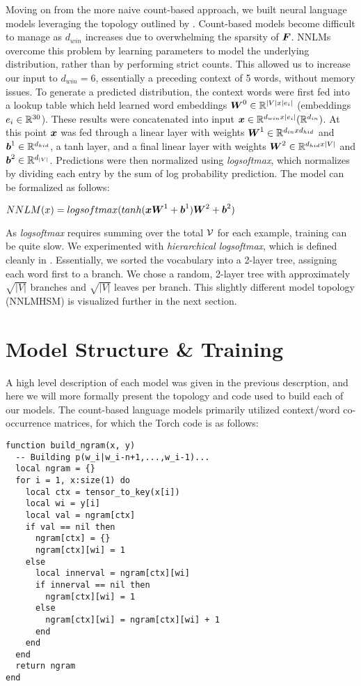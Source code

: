 \documentclass[11pt]{article}
\begin{document}
Moving on from the more naive count-based approach, we built neural language models leveraging the topology outlined by \citet{DBLP:journals/jmlr/BengioDVJ03}. Count-based models become difficult to manage as $d_{win}$ increases due to overwhelming the sparsity of $\boldsymbol{F}$. NNLMs overcome this problem by learning parameters to model the underlying distribution, rather than by performing strict counts. This allowed us to increase our input to $d_{win} = 6$, essentially a preceding context of 5 words, without memory issues. To generate a predicted distribution, the context words were first fed into a lookup table which held learned word embeddings $\boldsymbol{W}^{0} \in \mathbb{R}^{|V| x |e_{i}|}$ (embeddings $e_{i} \in \mathbb{R}^{30}$). These results were concatenated into input $\boldsymbol{x} \in \mathbb{R}^{d_{win} x |e_{i}|} (\mathbb{R}^{d_{in}})$. At this point $\boldsymbol{x}$ was fed through a linear layer with weights $\boldsymbol{W}^{1} \in \mathbb{R}^{d_{in} x d_{hid}}$ and $\boldsymbol{b}^{1} \in \mathbb{R}^{d_{hid}}$, a tanh layer, and a final linear layer with weights $\boldsymbol{W}^{2} \in \mathbb{R}^{d_{hid} x |V|}$ and $\boldsymbol{b}^{2} \in \mathbb{R}^{d_{|V|}}$. Predictions were then normalized using \textit{logsoftmax}, which normalizes by dividing each entry by the sum  of log probability prediction. The model can be formalized as follows:
\begin{center}
    $NNLM(x) = logsoftmax(tanh(\boldsymbol{x}\boldsymbol{W}^{1} + \boldsymbol{b}^{1})\boldsymbol{W}^{2} + \boldsymbol{b}^{2})$
\end{center}

As \textit{logsoftmax} requires summing over the total $\mathcal{V}$ for each example, training can be quite slow. We experimented with \textit{hierarchical logsoftmax}, which is defined cleanly in \citet{DBLP:journals/corr/MikolovSCCD13}. Essentially, we sorted the vocabulary into a 2-layer tree, assigning each word first to a branch. We chose a random, 2-layer tree with approximately $\sqrt{|V|}$ branches and $\sqrt{|V|}$ leaves per branch. This slightly different model topology (NNLMHSM) is visualized further in the next section.

\section{Model Structure \& Training}

A high level description of each model was given in the previous descrption, and here we will more formally present the topology and code used to build each of our models. The count-based language models primarily utilized context/word co-occurrence matrices, for which the Torch code is as follows:
\begin{verbatim}
function build_ngram(x, y)
  -- Building p(w_i|w_i-n+1,...,w_i-1)...
  local ngram = {}
  for i = 1, x:size(1) do
    local ctx = tensor_to_key(x[i])
    local wi = y[i]
    local val = ngram[ctx]
    if val == nil then
      ngram[ctx] = {}
      ngram[ctx][wi] = 1
    else
      local innerval = ngram[ctx][wi]
      if innerval == nil then
        ngram[ctx][wi] = 1
      else
        ngram[ctx][wi] = ngram[ctx][wi] + 1
      end
    end
  end
  return ngram
end
\end{verbatim}
\end{document}
